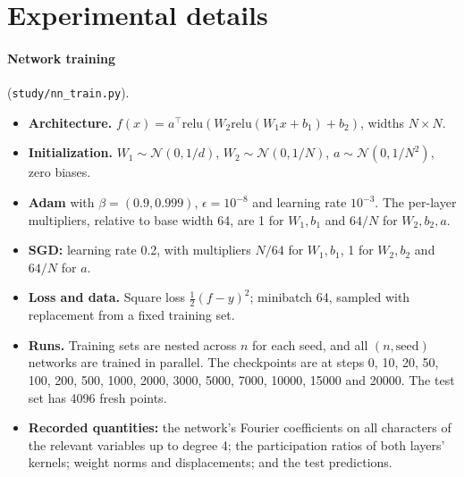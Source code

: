 \section{Experimental details}\label{app:experiments}
\sloppy

\paragraph{Network training} (\texttt{study/nn\_train.py}).
\begin{itemize}
\item \textbf{Architecture.} $f(x)=a^\top\mathrm{relu}(W_2\mathrm{relu}(W_1x+b_1)+b_2)$, widths $N\times N$.
\item \textbf{Initialization.} $W_1\sim\mathcal N(0,1/d)$, $W_2\sim\mathcal N(0,1/N)$, $a\sim\mathcal N(0,1/N^2)$, zero biases.
\item \textbf{Adam} \cite{kingma2015adam} with $\beta=(0.9,0.999)$, $\epsilon=10^{-8}$ and learning rate $10^{-3}$. The per-layer multipliers, relative to base width 64, are 1 for $W_1,b_1$ and $64/N$ for $W_2,b_2,a$.
\item \textbf{SGD:} learning rate 0.2, with multipliers $N/64$ for $W_1,b_1$, 1 for $W_2,b_2$ and $64/N$ for $a$.
\item \textbf{Loss and data.} Square loss $\tfrac12(f-y)^2$; minibatch 64, sampled with replacement from a fixed training set.
\item \textbf{Runs.} Training sets are nested across $n$ for each seed, and all $(n,\text{seed})$ networks are trained in parallel. The checkpoints are at steps 0, 10, 20, 50, 100, 200, 500, 1000, 2000, 3000, 5000, 7000, 10000, 15000 and 20000. The test set has 4096 fresh points.
\item \textbf{Recorded quantities:} the network's Fourier coefficients on all characters of the relevant variables up to degree 4; the participation ratios of both layers' kernels; weight norms and displacements; and the test predictions.
\end{itemize}

